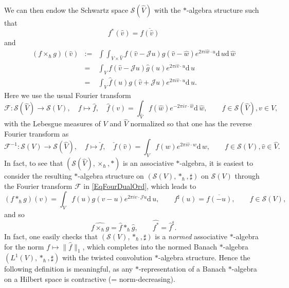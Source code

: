 \documentclass[11pt, reqno]{amsart}
\theoremstyle{definition}
\numberwithin{equation}{section}
\def\Sc{\mathcal S}
\newcommand{\rd}{\mathrm{d}\!\,}
\newcommand{\dint}{\int\!\!\!\!\int}
\newcommand{\msF}{\mathscr{F}}
\newcommand{\Jc}{\mathcal{J}}
\begin{document}
We can then endow the Schwartz space $\Sc(\hat{V})$ with the $*$-algebra structure such that \[
f^*(\hat{v}) = \overline{f(\hat{v})}
\]
and 
\begin{eqnarray}\label{EqTwistProd}
(f\times_{\hbar} g)(\hat{v}) &:=& \dint_{V\times \hat{V}} f(\hat{v}-\Jc u) g(\hat{v}-\hat{w}) e^{2\pi i \hat{w} \cdot u}\rd u \rd \hat{w}\\ &=& \int_V f(\hat{v}-\Jc u) \hat{g}(u) e^{2\pi i \hat{v} \cdot u}\rd u  \label{EqTwistProd2}\\
&=&  \int_V \hat{f}(u) g(\hat{v} + \Jc u) e^{2\pi i \hat{v} \cdot u}\rd u. \label{EqTwistProd3}
\end{eqnarray}
Here we use the usual Fourier transform 
\begin{equation}\label{EqFourDualOrd}
\msF\colon \Sc(\hat{V})\rightarrow \Sc(V),\quad f\mapsto \hat{f},\quad  \hat{f}(v) = \int_{\hat{V}} f(\hat{w}) e^{-2\pi i v\cdot \hat{w}}\rd \hat{w},\qquad f \in \Sc(\hat{V}),v\in V,
\end{equation}
with the Lebesgue measures of $V$ and $\hat{V}$ normalized so that one has the reverse Fourier transform as 
\begin{equation}\label{EqInvFourDualOrd}
\msF^{-1}\colon \Sc(V)\rightarrow \Sc(\hat{V}),\quad f\mapsto \check{f},\quad \check{f}(\hat{v}) = \int_{V} f(w) e^{2\pi i \hat{v}\cdot w}\rd w,\qquad f \in \Sc(V),\hat{v}\in \hat{V}.
\end{equation}
In fact, to see that $(\Sc(\hat{V}),\times_{\hbar},*)$ is an associative $*$-algebra, it is easiest to consider the resulting $*$-algebra structure on $(\Sc(V),\ast_{\hbar},\sharp)$ on $\Sc(V)$ through the Fourier transform $\msF$ in \eqref{EqFourDualOrd}, which  leads to
\[
(f\ast_{\hbar}g)(v) = \int_V f(u)g(v-u) e^{2\pi i v\cdot \Jc u}\rd u,\qquad f^{\sharp}(u) = \overline{f(-u)},\qquad f\in \Sc(V),
\]
and so 
\begin{equation}\label{EqFourierDualCross}
\widehat{f\times_{\hbar}g} = \hat{f}\ast_{\hbar} \hat{g},\qquad \widehat{f^*} = \hat{f}^{\sharp}. 
\end{equation}
In fact, one easily checks that $(\Sc(V),*_{\hbar},\sharp)$ is a \emph{normed} associative $*$-algebra for the norm $f \mapsto \|\hat{f}\|_1$, which completes into the normed Banach $*$-algebra $(L^1(V),\ast_{\hbar},\sharp)$ with the twisted convolution $*$-algebra structure. Hence the following definition is meaningful, as any $*$-representation of a Banach $*$-algebra on a Hilbert space is contractive (= norm-decreasing).
\end{document}
